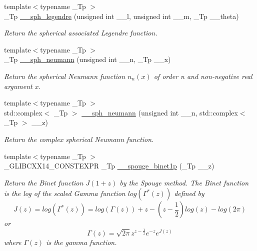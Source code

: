 \begin{DoxyCompactItemize}
{\footnotesize template$<$typename \+\_\+\+Tp $>$ }\\\+\_\+\+Tp \hyperlink{namespacestd_1_1____detail_a1c819d02915bdc2ab5c7693513ce0be0}{\+\_\+\+\_\+sph\+\_\+legendre} (unsigned int \+\_\+\+\_\+l, unsigned int \+\_\+\+\_\+m, \+\_\+\+Tp \+\_\+\+\_\+theta)
\begin{DoxyCompactList}\small\item\em Return the spherical associated Legendre function. \end{DoxyCompactList}\item 
{\footnotesize template$<$typename \+\_\+\+Tp $>$ }\\\+\_\+\+Tp \hyperlink{namespacestd_1_1____detail_a94ac68003333b86b157a3b1e6ce44830}{\+\_\+\+\_\+sph\+\_\+neumann} (unsigned int \+\_\+\+\_\+n, \+\_\+\+Tp \+\_\+\+\_\+x)
\begin{DoxyCompactList}\small\item\em Return the spherical Neumann function $ n_n(x) $ of order n and non-\/negative real argument {\ttfamily x}. \end{DoxyCompactList}\item 
{\footnotesize template$<$typename \+\_\+\+Tp $>$ }\\std\+::complex$<$ \+\_\+\+Tp $>$ \hyperlink{namespacestd_1_1____detail_ac72e28d4d5fb8b0ffa033b9a47b67a8e}{\+\_\+\+\_\+sph\+\_\+neumann} (unsigned int \+\_\+\+\_\+n, std\+::complex$<$ \+\_\+\+Tp $>$ \+\_\+\+\_\+z)
\begin{DoxyCompactList}\small\item\em Return the complex spherical Neumann function. \end{DoxyCompactList}\item 
{\footnotesize template$<$typename \+\_\+\+Tp $>$ }\\\+\_\+\+G\+L\+I\+B\+C\+X\+X14\+\_\+\+C\+O\+N\+S\+T\+E\+X\+PR \+\_\+\+Tp \hyperlink{namespacestd_1_1____detail_afa9284858d2bffbdc5d79fcbab68c307}{\+\_\+\+\_\+spouge\+\_\+binet1p} (\+\_\+\+Tp \+\_\+\+\_\+z)
\begin{DoxyCompactList}\small\item\em Return the Binet function $ J(1+z) $ by the Spouge method. The Binet function is the log of the scaled Gamma function $ log(\Gamma^*(z)) $ defined by \[ J(z) = log(\Gamma^*(z)) = log\left(\Gamma(z)\right) + z - \left(z-\frac{1}{2}\right) log(z) - log(2\pi) \] or \[ \Gamma(z) = \sqrt{2\pi}z^{z-\frac{1}{2}}e^{-z}e^{J(z)} \] where $ \Gamma(z) $ is the gamma function. \end{DoxyCompactList}\item 

\end{DoxyCompactItemize}
